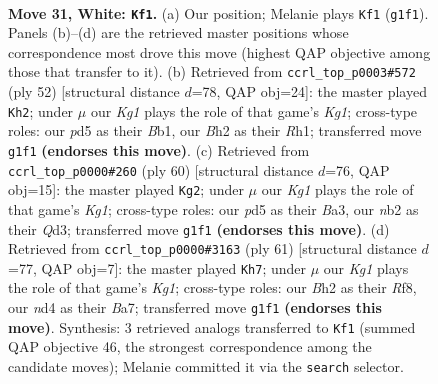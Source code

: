 \documentclass[11pt]{article}
\begin{document}
\clearpage

\begin{figure}[p]\centering
\begin{subfigure}{0.46\textwidth}\centering
\resizebox{\linewidth}{!}{%
\newchessgame
\chessboard[
  setfen={r5k1/1p3pb1/5qp1/p2p4/3n3p/7P/Pn3PPB/RN1BQ1K1 w - - 0 31},
  showmover=false,
  pgfstyle=straightmove, color=movearrow, markmove={g1-f1}
]}
\caption{}
\end{subfigure}\hfill
\begin{subfigure}{0.46\textwidth}\centering
\resizebox{\linewidth}{!}{%
\newchessgame
\chessboard[
  setfen={4r1k1/4q1b1/p2p1p2/3Pn1p1/2p1P3/6B1/P4PP1/1B1Q2KR w - - 0 27},
  showmover=false,
  pgfstyle=straightmove, color=movearrow, markmove={g1-h2}
]}
\caption{}
\end{subfigure}
\\[4pt]
\begin{subfigure}{0.46\textwidth}\centering
\resizebox{\linewidth}{!}{%
\newchessgame
\chessboard[
  setfen={2r3k1/p1q1ppbp/1p4p1/3P4/P2nB3/B2Q2PP/1P3P2/3R2K1 w - - 2 31},
  showmover=false,
  pgfstyle=straightmove, color=movearrow, markmove={g1-g2}
]}
\caption{}
\end{subfigure}\hfill
\begin{subfigure}{0.46\textwidth}\centering
\resizebox{\linewidth}{!}{%
\newchessgame
\chessboard[
  setfen={5rk1/bp2Npp1/p5b1/3p4/q1n3BP/2P2PB1/1P2Q1K1/4R3 b - - 3 31},
  showmover=false,
  pgfstyle=straightmove, color=movearrow, markmove={g8-h7}
]}
\caption{}
\end{subfigure}
\caption{\textbf{Move 31, White: \texttt{Kf1}.} (a) Our position; Melanie plays \texttt{Kf1} (\texttt{g1f1}). Panels (b)--(d) are the retrieved master positions whose correspondence most drove this move (highest QAP objective among those that transfer to it). (b) Retrieved from \texttt{ccrl\_top\_p0003\#572} (ply 52) [structural distance $d$=78, QAP obj=24]: the master played \texttt{Kh2}; under $\mu$ our \emph{Kg1} plays the role of that game's \emph{Kg1}; cross-type roles: our \emph{p}d5 as their \emph{B}b1, our \emph{B}h2 as their \emph{R}h1; transferred move \texttt{g1f1} \textbf{(endorses this move)}. (c) Retrieved from \texttt{ccrl\_top\_p0000\#260} (ply 60) [structural distance $d$=76, QAP obj=15]: the master played \texttt{Kg2}; under $\mu$ our \emph{Kg1} plays the role of that game's \emph{Kg1}; cross-type roles: our \emph{p}d5 as their \emph{B}a3, our \emph{n}b2 as their \emph{Q}d3; transferred move \texttt{g1f1} \textbf{(endorses this move)}. (d) Retrieved from \texttt{ccrl\_top\_p0000\#3163} (ply 61) [structural distance $d$=77, QAP obj=7]: the master played \texttt{Kh7}; under $\mu$ our \emph{Kg1} plays the role of that game's \emph{Kg1}; cross-type roles: our \emph{B}h2 as their \emph{R}f8, our \emph{n}d4 as their \emph{B}a7; transferred move \texttt{g1f1} \textbf{(endorses this move)}. Synthesis: 3 retrieved analogs transferred to \texttt{Kf1} (summed QAP objective 46, the strongest correspondence among the candidate moves); Melanie committed it via the \texttt{search} selector.}
\label{fig:thought-m60}
\end{figure}
\end{document}

